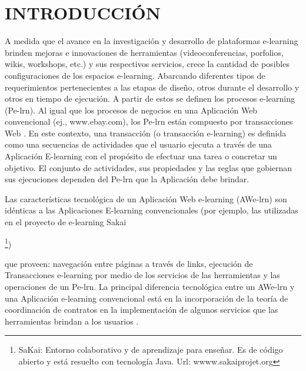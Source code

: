 \section {INTRODUCCIÓN} \label{intro}

A medida que el avance en la investigación y desarrollo de plataformas
e-learning brinden  mejoras e innovaciones de herramientas (videoconferencias,
porfolios, wikis, workshops, etc.) y sus respectivos servicios,  crece la
cantidad de posibles configuraciones de los espacios e-learning.  Abarcando
diferentes tipos de requerimientos pertenecientes a las etapas de diseño, otros
durante el desarrollo y otros en tiempo de ejecución. A partir de estos se
definen los procesos e-learning (Pe-lrn). Al igual que los procesos de negocios
en una Aplicación Web convencional (ej., www.ebay.com), los Pe-lrn están
compuesto por transacciones Web \cite{transaccion web}. En este contexto, una
transacción (o transacción e-learning) es definida como una secuencias de
actividades que el usuario ejecuta a través de una Aplicación E-learning con el
propósito de efectuar una tarea o concretar un objetivo. El conjunto de
actividades, sus propiedades y las reglas que gobiernan sus ejecuciones dependen
del Pe-lrn que la Aplicación debe brindar.

Las características tecnológica de un Aplicación Web e-learning (AWe-lrn) son
idénticas a las Aplicaciones E-learning convencionales (por ejemplo, las
utilizadas en el proyecto de e-learning Sakai

\footnote{SaKai: Entorno
colaborativo y de aprendizaje para enseñar. Es de código abierto y está resuelto
con tecnología Java. Url: wwww.sakaiprojet.org}) 


que proveen:  navegación entre
páginas a través de links, ejecución de Transacciones e-learning por medio de
los servicios de las herramientas y las operaciones de un Pe-lrn. La principal
diferencia tecnológica entre un AWe-lrn y una Aplicación e-learning convencional
está en la incorporación de la teoría de coordinación de contratos
\cite{fiadeiro,libro5} en la implementación de algunos servicios que las
herramientas brindan a los usuarios \cite{libro}.


